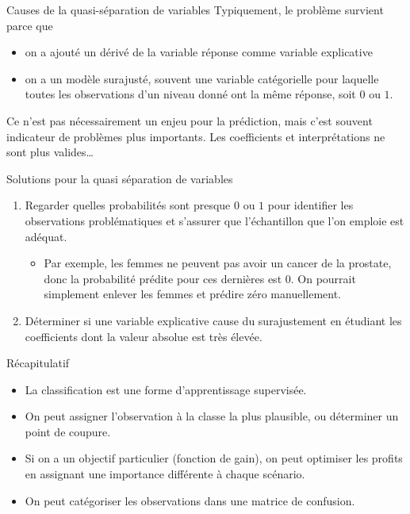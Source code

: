 \documentclass[
  ignorenonframetext,
]{beamer}
\providecommand{\tightlist}{%
  \setlength{\itemsep}{0pt}\setlength{\parskip}{0pt}}\usepackage{longtable,booktabs,array}
\begin{document}
\begin{frame}{Causes de la quasi-séparation de variables}
\protect\hypertarget{causes-de-la-quasi-suxe9paration-de-variables}{}
Typiquement, le problème survient parce que

\begin{itemize}
\tightlist
\item
  on a ajouté un dérivé de la variable réponse comme variable
  explicative
\item
  on a un modèle surajusté, souvent une variable catégorielle pour
  laquelle toutes les observations d'un niveau donné ont la même
  réponse, soit \(0\) ou \(1\).
\end{itemize}

Ce n'est pas nécessairement un enjeu pour la prédiction, mais c'est
souvent indicateur de problèmes plus importants. Les coefficients et
interprétations ne sont plus valides\ldots{}
\end{frame}

\begin{frame}{Solutions pour la quasi séparation de variables}
\protect\hypertarget{solutions-pour-la-quasi-suxe9paration-de-variables}{}
\begin{enumerate}
\tightlist
\item
  Regarder quelles probabilités sont presque \(0\) ou \(1\) pour
  identifier les observations problématiques et s'assurer que
  l'échantillon que l'on emploie est adéquat.

  \begin{itemize}
  \tightlist
  \item
    Par exemple, les femmes ne peuvent pas avoir un cancer de la
    prostate, donc la probabilité prédite pour ces dernières est \(0\).
    On pourrait simplement enlever les femmes et prédire zéro
    manuellement.
  \end{itemize}
\item
  Déterminer si une variable explicative cause du surajustement en
  étudiant les coefficients dont la valeur absolue est très élevée.
\end{enumerate}
\end{frame}

\begin{frame}{Récapitulatif}
\protect\hypertarget{ruxe9capitulatif}{}
\begin{itemize}
\tightlist
\item
  La classification est une forme d'apprentissage supervisée.
\item
  On peut assigner l'observation à la classe la plus plausible, ou
  déterminer un point de coupure.
\item
  Si on a un objectif particulier (fonction de gain), on peut optimiser
  les profits en assignant une importance différente à chaque scénario.
\item
  On peut catégoriser les observations dans une matrice de confusion.
\end{itemize}
\end{frame}
\end{document}
